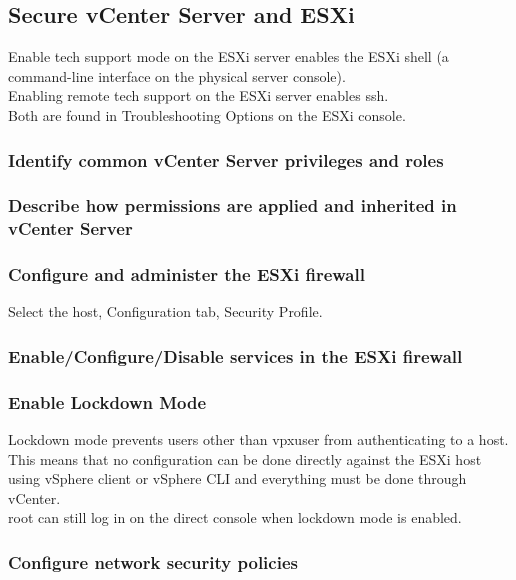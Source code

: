\subsection{Secure vCenter Server and ESXi}

Enable tech support mode on the ESXi server enables the ESXi shell (a command-line interface on
the physical server console).\\

Enabling remote tech support on the ESXi server enables ssh.\\

Both are found in Troubleshooting Options on the ESXi console.

\subsubsection{Identify common vCenter Server privileges and roles}

\subsubsection{Describe how permissions are applied and inherited in vCenter Server}

\subsubsection{Configure and administer the ESXi firewall}

Select the host, Configuration tab, Security Profile.

\subsubsection{Enable/Configure/Disable services in the ESXi firewall}

\subsubsection{Enable Lockdown Mode}

Lockdown mode prevents users other than vpxuser from authenticating to a host.
This means that no configuration can be done directly against the ESXi host
using vSphere client or vSphere CLI and everything must be done through
vCenter.\\

root can still log in on the direct console when lockdown mode is enabled.

\subsubsection{Configure network security policies}

